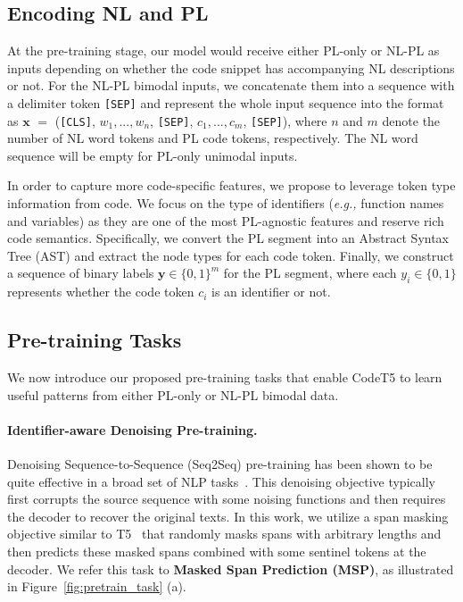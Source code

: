 \documentclass[11pt]{article}
\newcommand{\eg}{{\em e.g.,}\xspace}
\begin{document}
\subsection{Encoding NL and PL}\label{model:input}
At the pre-training stage, our model would receive either PL-only or NL-PL as inputs depending on whether the code snippet has accompanying NL descriptions or not. For the NL-PL bimodal inputs, we concatenate them into a sequence with a delimiter token  \texttt{[SEP]} and represent the whole input sequence into the format as $\mathbf{x}$ $=$ (\texttt{[CLS]}, $w_1,...,w_n$, \texttt{[SEP]}, $c_1,...,c_m$, \texttt{[SEP]}), where $n$ and $m$ denote the number of NL word tokens  and PL code tokens, respectively. The NL word sequence will be empty for PL-only unimodal inputs. 

In order to capture more code-specific features, we propose to leverage token type information from code. We focus on the type of identifiers (\eg function names and variables) as they are one of the most PL-agnostic features and reserve rich code semantics.
Specifically, we convert the PL segment into an Abstract Syntax Tree (AST) and extract the node types for each code token. Finally, we construct a sequence of binary labels $\mathbf{y} \in {\{0,1\}^m}$ for the PL segment, where each $y_i\in \{0, 1\}$ represents whether the code token $c_i$ is an identifier or not.


\subsection{Pre-training Tasks}\label{model:pretrain}

We now introduce our proposed pre-training tasks that enable CodeT5 to learn useful patterns from either PL-only or NL-PL bimodal data. 

\paragraph{Identifier-aware Denoising Pre-training.}
Denoising Sequence-to-Sequence (Seq2Seq) pre-training has been shown to be quite effective in a broad set of NLP tasks~\cite{DBLP:conf/icml/SongTQLL19,DBLP:journals/jmlr/RaffelSRLNMZLL20,DBLP:conf/acl/LewisLGGMLSZ20}. This denoising objective typically first corrupts the source sequence with some noising functions and then requires the decoder to recover the original texts.
In this work, we utilize a  span masking objective similar to T5~\cite{DBLP:journals/jmlr/RaffelSRLNMZLL20} that randomly masks spans with arbitrary lengths and then predicts these masked spans combined with some sentinel tokens at the decoder.
We refer this task to \textbf{Masked Span Prediction (MSP)}, as illustrated in Figure~\ref{fig:pretrain_task} (a).
\end{document}
